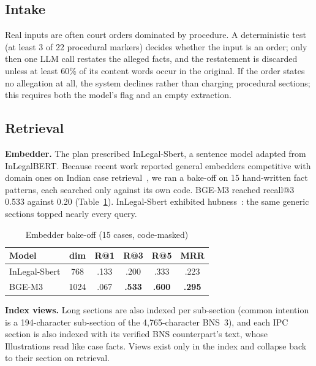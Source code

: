 \documentclass[conference]{IEEEtran}
\begin{document}
\subsection{Intake}
Real inputs are often court orders dominated by procedure. A deterministic test (at least 3 of 22 procedural markers) decides whether the input is an order; only then one LLM call restates the alleged facts, and the restatement is discarded unless at least 60\% of its content words occur in the original. If the order states no allegation at all, the system declines rather than charging procedural sections; this requires both the model's flag and an empty extraction.

\subsection{Retrieval}
\textbf{Embedder.} The plan prescribed InLegal-Sbert, a sentence model adapted from InLegalBERT. Because recent work reported general embedders competitive with domain ones on Indian case retrieval~\cite{pcrembed}, we ran a bake-off on 15 hand-written fact patterns, each searched only against its own code. BGE-M3 reached recall@3 0.533 against 0.20 (Table~\ref{tab:bakeoff}). InLegal-Sbert exhibited hubness~\cite{hubness}: the same generic sections topped nearly every query.

\begin{table}[t]
\caption{Embedder bake-off (15 cases, code-masked)}
\label{tab:bakeoff}
\centering
\begin{tabular}{lccccc}
\toprule
Model & dim & R@1 & R@3 & R@5 & MRR\\
\midrule
InLegal-Sbert & 768 & .133 & .200 & .333 & .223\\
BGE-M3 & 1024 & .067 & \textbf{.533} & \textbf{.600} & \textbf{.295}\\
\bottomrule
\end{tabular}
\end{table}

\textbf{Index views.} Long sections are also indexed per sub-section (common intention is a 194-character sub-section of the 4,765-character BNS~3), and each IPC section is also indexed with its verified BNS counterpart's text, whose Illustrations read like case facts. Views exist only in the index and collapse back to their section on retrieval.
\end{document}
